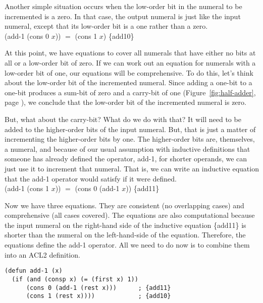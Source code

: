 Another simple situation occurs when the low-order bit in the
numeral to be incremented is a zero.
In that case, the output numeral is
just like the input numeral, except that its
low-order bit is a one rather than a zero.
\\
\vspace{2mm}
\hspace*{2cm}
\textsf{(add-1 (cons 0 $x$))} $=$ \textsf{(cons 1 $x$)}    \hfill \{add10\}

At this point, we have equations to cover all numerals
that have either no bits at all or a low-order bit
of zero. If we can work out an equation for numerals
with a low-order bit of one, our equations will be comprehensive.
To do this, let's think about the
low-order bit of the incremented numeral.
Since adding a one-bit to a one-bit produces a sum-bit
of zero and a carry-bit of one
(Figure~\ref{fig:half-adder}, page \pageref{fig:half-adder}),
we conclude that the low-order bit of the incremented numeral
is zero.

But, what about the carry-bit? What do we do with that?
It will need to be added to the higher-order bits of
the input numeral. But, that is just a matter of incrementing
the higher-order bits by one.
The higher-order bits are, themselves, a numeral,
and because of our usual assumption with inductive definitions that
someone has already defined the operator,
\textsf{add-1}, for shorter operands,
we can just use it to increment that numeral.
That is, we can write an inductive equation that the \textsf{add-1} operator
would satisfy if it were defined.
\\
\vspace{2mm}
\hspace*{2cm}
\textsf{(add-1 (cons 1 $x$))} $=$ \textsf{(cons 0 (add-1 $x$))}   \hfill \{add11\}

Now we have three equations.
They are consistent (no overlapping cases) and
comprehensive (all cases covered).
The equations are also computational because the input numeral
on the right-hand side of the inductive equation
\{add11\} is shorter than
the numeral on the left-hand-side of the equation.
Therefore, the equations define the \textsf{add-1} operator.
All we need to do now is to combine them into an ACL2 definition.

\label{add-1-defun}
\begin{code}
\begin{verbatim}
(defun add-1 (x)
  (if (and (consp x) (= (first x) 1))
      (cons 0 (add-1 (rest x)))      ; {add11}
      (cons 1 (rest x))))            ; {add10}
\end{verbatim}
\end{code}

